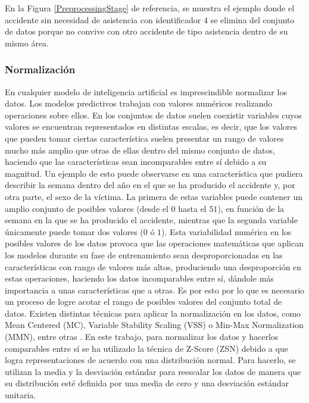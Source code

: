 \documentclass{uathesis-es}
\begin{document}
En la Figura \ref{PreprocessingStage} de referencia, se muestra el ejemplo donde el accidente sin necesidad de asistencia con identificador $4$ se elimina del conjunto de datos porque no convive con otro accidente de tipo asistencia dentro de su mismo área.


\subsubsection{Normalización}

En cualquier modelo de inteligencia artificial es imprescindible normalizar los datos. Los modelos predictivos trabajan con valores numéricos realizando operaciones sobre ellos. En los conjuntos de datos suelen coexistir variables cuyos valores se encuentran representados en distintas escalas, es decir, que los valores que pueden tomar ciertas característica suelen presentar un rango de valores mucho más amplio que otras de ellas dentro del mismo conjunto de datos, haciendo que las características sean incomparables entre sí debido a su magnitud. Un ejemplo de esto puede observarse en una característica que pudiera describir la semana dentro del año en el que se ha producido el accidente y, por otra parte, el sexo de la víctima. La primera de estas variables puede contener un amplio conjunto de posibles valores (desde el $0$ hasta el $51$), en función de la semana en la que se ha producido el accidente, mientras que la segunda variable únicamente puede tomar dos valores ($0$ ó $1$). Esta variabilidad numérica en los posibles valores de los datos provoca que las operaciones matemáticas que aplican los modelos durante su fase de entrenamiento sean desproporcionadas en las características con rango de valores más altos, produciendo una desproporción en estas operaciones, haciendo los datos incomparables entre sí, dándole más importancia a unas características que a otras. Es por esto por lo que es necesario un proceso de logre acotar el rango de posibles valores del conjunto total de datos. Existen distintas técnicas para aplicar la normalización en los datos, como Mean Centered (MC), Variable Stability Scaling (VSS) o Min-Max Normalization (MMN), entre otras \cite{DataNormalizationInvestigation}. En este trabajo, para normalizar los datos y hacerlos comparables entre sí se ha utilizado la técnica de Z-Score (ZSN) debido a que logra representaciones de acuerdo con una distribución normal. Para hacerlo, se utilizan la media y la desviación estándar para reescalar los datos de manera que su distribución esté definida por una media de cero y una desviación estándar unitaria.
\end{document}
